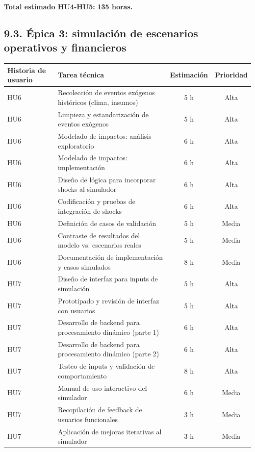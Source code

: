 \documentclass[
11pt, %
]{charter}
\begin{document}
\vspace{0.2cm}
\noindent
\textbf{Total estimado HU4-HU5:} \textbf{135 horas.}

\subsection*{9.3. Épica 3: simulación de escenarios operativos y financieros}

\begin{table}[H]
\centering
\begin{tabular}{|l|p{6cm}|c|c|}
\hline
\textbf{Historia de usuario} & \textbf{Tarea técnica} & \textbf{Estimación} & \textbf{Prioridad} \\
\hline
HU6 & Recolección de eventos exógenos históricos (clima, insumos) & 5 h & Alta \\
HU6 & Limpieza y estandarización de eventos exógenos & 5 h & Alta \\
HU6 & Modelado de impactos: análisis exploratorio & 6 h & Alta \\
HU6 & Modelado de impactos: implementación & 6 h & Alta \\
HU6 & Diseño de lógica para incorporar shocks al simulador & 6 h & Alta \\
HU6 & Codificación y pruebas de integración de shocks & 6 h & Alta \\
HU6 & Definición de casos de validación & 5 h & Media \\
HU6 & Contraste de resultados del modelo vs. escenarios reales & 5 h & Media \\
HU6 & Documentación de implementación y casos simulados & 8 h & Media \\
\hline
HU7 & Diseño de interfaz para inputs de simulación & 5 h & Alta \\
HU7 & Prototipado y revisión de interfaz con usuarios & 5 h & Alta \\
HU7 & Desarrollo de backend para procesamiento dinámico (parte 1) & 6 h & Alta \\
HU7 & Desarrollo de backend para procesamiento dinámico (parte 2) & 6 h & Alta \\
HU7 & Testeo de inputs y validación de comportamiento & 8 h & Alta \\
HU7 & Manual de uso interactivo del simulador & 6 h & Media \\
HU7 & Recopilación de feedback de usuarios funcionales & 3 h & Media \\
HU7 & Aplicación de mejoras iterativas al simulador & 3 h & Media \\

\end{tabular}
\end{table}
\end{document}
